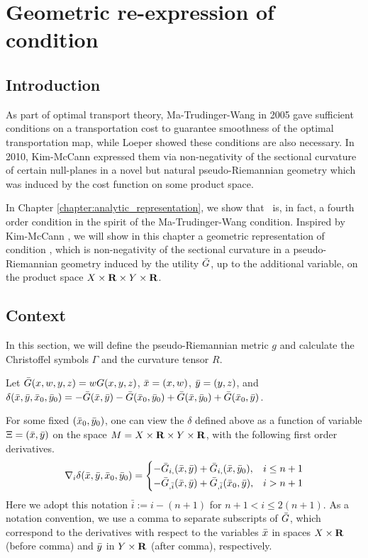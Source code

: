\chapter{Geometric re-expression of condition \Gthree}\label{chapter:geometry}

\section{Introduction}

As part of optimal transport theory, Ma-Trudinger-Wang \cite{MaTrudingerWang05} in 2005 gave sufficient conditions on a transportation cost to guarantee smoothness of the optimal transportation map, while Loeper \cite{Loeper09} showed these conditions are also necessary. In 2010, Kim-McCann \cite{KimMcCann10} expressed them via non-negativity of the sectional curvature of certain null-planes in a novel but natural pseudo-Riemannian geometry which was induced by the cost function on some product space.\medskip

In Chapter \ref{chapter:analytic_representation}, we show that \Gthree~is, in fact, a fourth order condition in the spirit of the Ma-Trudinger-Wang condition. Inspired by Kim-McCann \cite{KimMcCann10}, we will show in this chapter a geometric representation of condition \Gthree, which is non-negativity of the sectional curvature in a pseudo-Riemannian geometry induced by the utility $\bar{G}$, up to the additional variable, on the product space $X\times {\mathbf R} \times Y \times {\mathbf R}$.\medskip

\section{Context}\label{section:geometric_setting}

In this section, we will define the pseudo-Riemannian metric $g$ and calculate the Christoffel symbols $\Gamma$ and the curvature tensor $R$. \medskip

Let $\bar{G} (x,w, y,z) = w G(x,y,z)$, $\bar{x} = (x,w)$, $\bar{y} = (y,z)$, and $\delta(\bar{x}, \bar{y}, \bar{x}_{0}, \bar{y}_{0}) = -\bar{G} (\bar{x}, \bar{y}) -\bar{G}(\bar{x}_0, \bar{y}_0) +\bar{G}(\bar{x}, \bar{y}_0) + \bar{G}(\bar{x}_0, \bar{y})$.\medskip

For some fixed $(\bar{x}_0, \bar{y}_0)$, one can view the $\delta$ defined above as a function of variable $\Xi =(\bar{x}, \bar{y})$ on the space $M = X \times {\mathbf R} \times Y \times {\mathbf R}$, with the following first order derivatives.
\begin{equation}
	\nabla_i \delta (\bar{x}, \bar{y}, \bar{x}_0, \bar{y}_0) = \begin{cases}
	-\bar{G}_{i,}(\bar{x}, \bar{y}) + \bar{G}_{i,}(\bar{x}, \bar{y}_0) , & i\le n+1\\
	-\bar{G}_{,\bar{i}}(\bar{x}, \bar{y}) + \bar{G}_{,\bar{i}}(\bar{x}_0, \bar{y}), & i> n+1 \\
	\end{cases}
\end{equation}
Here we adopt this notation $\bar{i}:= i-(n+1)$ for $n+1 <i\le 2(n+1)$. As a notation convention, we use a comma to separate subscripts of $\bar{G}$, which correspond to the derivatives with respect to the variables $\bar{x}$ in spaces $X \times {\mathbf R}$ (before comma) and $\bar{y}$ in $Y \times {\mathbf R}$ (after comma), respectively.\medskip

